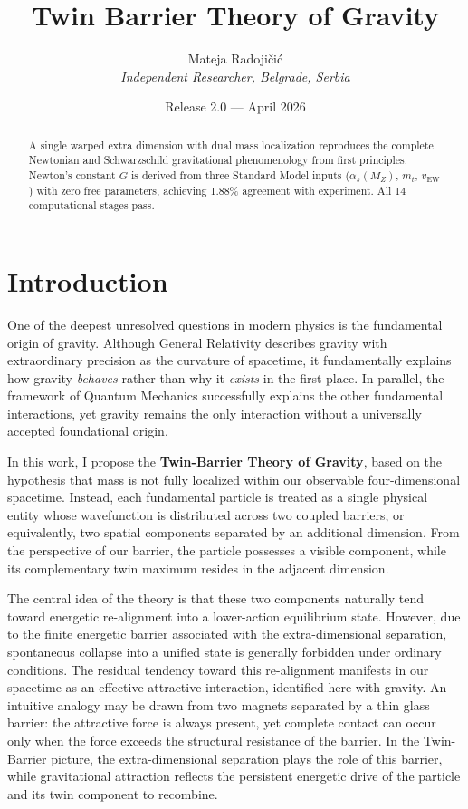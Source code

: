 \documentclass[
  11pt,
]{article}
\title{Twin Barrier Theory of Gravity}
\author{Mateja Radojičić\\\textit{Independent Researcher, Belgrade, Serbia}}
\date{Release 2.0 --- April 2026}
\begin{document}
\maketitle

\begin{abstract}
A single warped extra dimension with dual mass localization reproduces the complete Newtonian and Schwarzschild gravitational phenomenology from first principles. Newton's constant $G$ is derived from three Standard Model inputs ($\alpha_s(M_Z)$, $m_t$, $v_{\text{EW}}$) with zero free parameters, achieving 1.88\% agreement with experiment. All 14 computational stages pass.
\end{abstract}

\newpage


\tableofcontents
\newpage

\section{Introduction}\label{sec:introduction}

One of the deepest unresolved questions in modern physics is the
fundamental origin of gravity. Although General Relativity describes
gravity with extraordinary precision as the curvature of spacetime, it
fundamentally explains how gravity \emph{behaves} rather than why it
\emph{exists} in the first place. In parallel, the framework of Quantum
Mechanics successfully explains the other fundamental interactions, yet
gravity remains the only interaction without a universally accepted
foundational origin.

In this work, I propose the \textbf{Twin-Barrier Theory of Gravity},
based on the hypothesis that mass is not fully localized within our
observable four-dimensional spacetime. Instead, each fundamental
particle is treated as a single physical entity whose wavefunction is
distributed across two coupled barriers, or equivalently, two spatial
components separated by an additional dimension. From the perspective of
our barrier, the particle possesses a visible component, while its
complementary twin maximum resides in the adjacent dimension.

The central idea of the theory is that these two components naturally
tend toward energetic re-alignment into a lower-action equilibrium
state. However, due to the finite energetic barrier associated with the
extra-dimensional separation, spontaneous collapse into a unified state
is generally forbidden under ordinary conditions. The residual tendency
toward this re-alignment manifests in our spacetime as an effective
attractive interaction, identified here with gravity. An intuitive
analogy may be drawn from two magnets separated by a thin glass barrier:
the attractive force is always present, yet complete contact can occur
only when the force exceeds the structural resistance of the barrier. In
the Twin-Barrier picture, the extra-dimensional separation plays the
role of this barrier, while gravitational attraction reflects the
persistent energetic drive of the particle and its twin component to
recombine.
\end{document}
